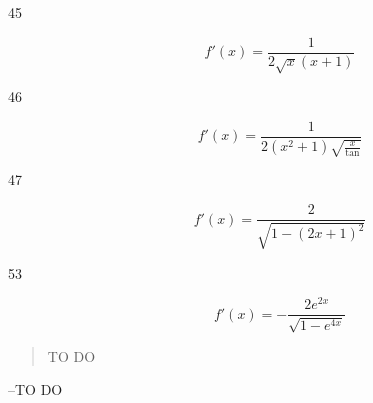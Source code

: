 \documentclass[letterpaper, landscape]{exam}
\begin{document}
\begin{description}
    \item[45] 
      \[
        f'(x) = \frac{1}{2 \sqrt{x} (x + 1)}
      \]

    \item[46] 
      \[
        f'(x) = \frac{1}{2 \left(x^2 + 1\right) \sqrt{\frac{x}{\tan }}}
      \]

    \item[47] 
      \[
        f'(x) = \frac{2}{\sqrt{1-(2 x+1)^2}}
      \]

    \item[53] 
      \[
        f'(x) = - \frac{2 e^{2x}}{\sqrt{1 - e^{4x}}}
      \]

  \end{description}

  \else
    \vspace{10 cm}
    \begin{quote}
      \begin{em}
        TO DO
      \end{em}
    \end{quote}
    \hspace{2 cm} --TO DO
  \fi
\end{document}
